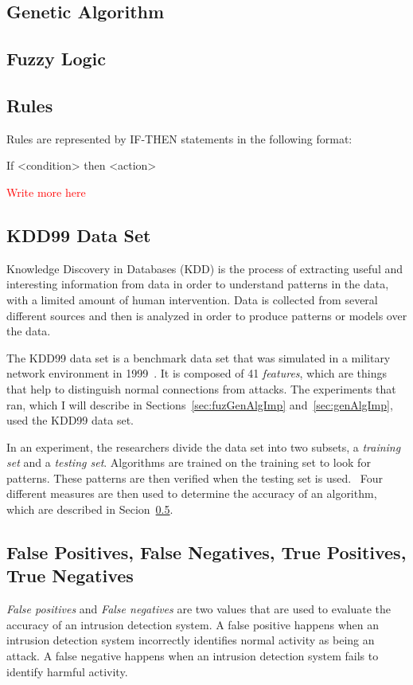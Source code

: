 \documentclass{sig-alternate}
\newcommand{\mycomment}[1]{\textcolor{red}{#1}}
\begin{document}
\subsection{Genetic Algorithm}

\subsection{Fuzzy Logic}


\subsection{Rules}
Rules are represented by IF-THEN statements in the following format:

If <condition> then <action>

\mycomment{Write more here}




\subsection{KDD99 Data Set}
Knowledge Discovery in Databases (KDD) is the process of extracting useful and interesting information from data in order to understand patterns in the data, with a limited amount of human intervention. Data is collected from several different sources and then is analyzed in order to produce patterns or models over the data.~\cite{bc1_ecindm}

The KDD99 data set is a benchmark data set that was simulated in a military network environment in 1999~\cite{6559603}. It is composed of 41 \emph{features}, which are things that help to distinguish normal connections from attacks. The experiments that~\cite{6559603, DBLP:journals/corr/abs-1204-1336} ran, which I will describe in Sections~\ref{sec:fuzGenAlgImp} and~\ref{sec:genAlgImp}, used the KDD99 data set.

In an experiment, the researchers divide the data set into two subsets, a \emph{training set} and a \emph{testing set}. Algorithms are trained on the training set to look for patterns. These patterns are then verified when the testing set is used.~\cite{bc1_ecindm} Four different measures are then used to determine the accuracy of an algorithm, which are described in Secion~\ref{sec:PosNeg}.




\subsection{False Positives, False Negatives, True Positives, True Negatives}
\label{sec:PosNeg}
\emph{False positives} and \emph{False negatives} are two values that are used to evaluate the accuracy of an intrusion detection system. A false positive happens when an intrusion detection system incorrectly identifies normal activity as being an attack. A false negative happens when an intrusion detection system fails to identify harmful activity.~\cite{Liao201316}
\end{document}
